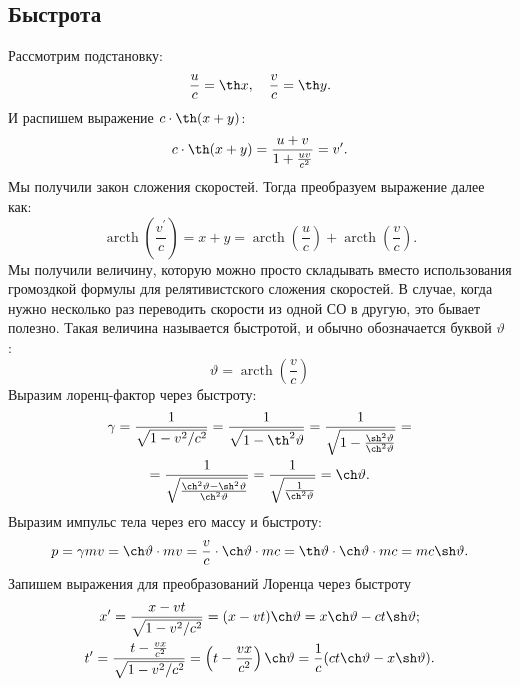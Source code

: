 \subsection{Быстрота}
Рассмотрим подстановку:
\begin{equation}
	\frac{u}{c} = \th x, \quad \frac{v}{c} = \th y.
\end{equation}
И распишем выражение $c \cdot \th (x+y)$:
\begin{equation*}
	c \cdot \th (x+y)=\frac{u+v}{1+\frac{u v}{c^2}}=v^{\prime}.
\end{equation*}
Мы получили закон сложения скоростей. Тогда преобразуем выражение далее как:
\begin{equation*}
\operatorname{arcth}\left(\frac{v^{\prime}}{c}\right)=x+y=\operatorname{arcth}\left(\frac{u}{c}\right)+\operatorname{arcth}\left(\frac{v}{c}\right).
\end{equation*}
Мы получили величину, которую можно просто складывать вместо использования громоздкой формулы для релятивистского сложения скоростей. В случае, когда нужно несколько раз переводить скорости из одной СО в другую, это бывает полезно. Такая величина называется быстротой, и обычно обозначается буквой $\vartheta$ :
\begin{equation*}
	\vartheta=\operatorname{arcth}\left(\frac{v}{c}\right)
\end{equation*}
Выразим лоренц-фактор через быстроту:
\begin{multline}
	\gamma=\frac{1}{\sqrt{1-v^2 / c^2}}=\frac{1}{\sqrt{1-\th ^2 \vartheta}}=\frac{1}{\sqrt{1-\frac{\sh ^2 \vartheta}{\ch ^2 \vartheta}}}=\\=\frac{1}{\sqrt{\frac{\ch ^2 \vartheta-\sh ^2 \vartheta}{\ch ^2 \vartheta}}}=\frac{1}{\sqrt{\frac{1}{\ch ^2 \vartheta}}}=\ch \vartheta.
\end{multline}
Выразим импульс тела через его массу и быстроту:
\begin{equation}
p=\gamma m v=\ch \vartheta \cdot m v=\frac{v}{c} \cdot \ch \vartheta \cdot m c=\th \vartheta \cdot \ch \vartheta \cdot m c=m c \sh \vartheta.
\end{equation}
Запишем выражения для преобразований Лоренца через быстроту
\begin{gather*}
x^{\prime}=\frac{x-v t}{\sqrt{1-v^2 / c^2}}=(x-v t) \ch \vartheta=x \ch \vartheta-c t \sh \vartheta; \\
t^{\prime}=\frac{t-\frac{v x}{c^2}}{\sqrt{1-v^2 / c^2}}=\left(t-\frac{v x}{c^2}\right) \ch \vartheta=\frac{1}{c}(c t \ch \vartheta-x \sh \vartheta).
\end{gather*}
